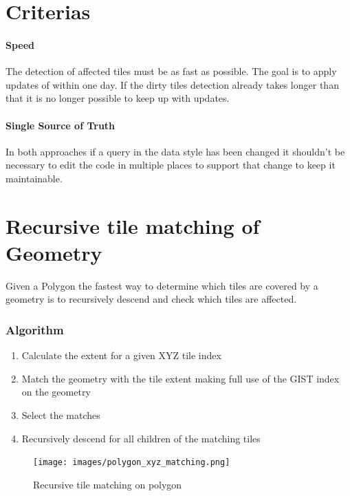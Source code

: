 
\section{Criterias}\label{criterias}

\paragraph{Speed} 
The detection of affected tiles must be as fast as possible. 
The goal is to apply updates of \osm{} within one day. If the dirty tiles detection
already takes longer than that it is no longer possible to keep up with \osm{} updates.

\paragraph{Single Source of Truth}

In both approaches if a query in the data style has been changed it shouldn't be necessary
to edit the code in multiple places to support that change to keep it maintainable.


\section{Recursive tile matching of Geometry}

Given a Polygon the fastest way to determine which tiles are covered by a geometry is to recursively descend and check which tiles are affected.

\subsubsection*{Algorithm}

\begin{enumerate}  
    \item Calculate the extent for a given XYZ tile index
    \item Match the geometry with the tile extent making full use of the GIST index on the geometry
    \item Select the matches
    \item Recursively descend for all children of the matching tiles
\end{enumerate}

\begin{figure}[H]
  \centering
  \texttt{[image: images/polygon\_xyz\_matching.png]}
  \caption{Recursive tile matching on polygon}
\end{figure}

